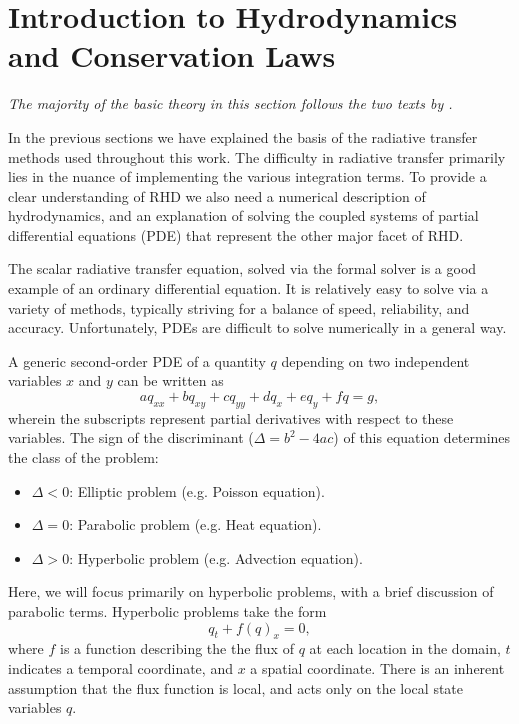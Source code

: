 \section{Introduction to Hydrodynamics and Conservation Laws}
\emph{The majority of the basic theory in this section follows the two texts by \citet{LeVeque1997,LeVeque2002}.}

In the previous sections we have explained the basis of the radiative transfer methods used throughout this work.
The difficulty in radiative transfer primarily lies in the nuance of implementing the various integration terms.
To provide a clear understanding of RHD we also need a numerical description of hydrodynamics, and an explanation of solving the coupled systems of partial differential equations (PDE) that represent the other major facet of RHD.

The scalar radiative transfer equation, solved via the formal solver is a good example of an ordinary differential equation.
It is relatively easy to solve via a variety of methods, typically striving for a balance of speed, reliability, and accuracy.
Unfortunately, PDEs are difficult to solve numerically in a general way.

A generic second-order PDE of a quantity $q$ depending on two independent variables $x$ and $y$ can be written as
\begin{equation}
    aq_{xx} + bq_{xy} + cq_{yy} + dq_x + eq_y + fq = g,
\end{equation}
wherein the subscripts represent partial derivatives with respect to these variables.
The sign of the discriminant ($\Delta = b^2-4ac$) of this equation determines the class of the problem:
\begin{itemize}
    \item $\Delta < 0$: Elliptic problem (e.g. Poisson equation).
    \item $\Delta = 0$: Parabolic problem (e.g. Heat equation).
    \item $\Delta > 0$: Hyperbolic problem (e.g. Advection equation).
\end{itemize}
Here, we will focus primarily on hyperbolic problems, with a brief discussion of parabolic terms.
Hyperbolic problems take the form
\begin{equation}\label{Eq:ConsLaw}
    q_t + f(q)_x = 0,
\end{equation}
where $f$ is a function describing the the flux of $q$ at each location in the domain, $t$ indicates a temporal coordinate, and $x$ a spatial coordinate.
There is an inherent assumption that the flux function is local, and acts only on the local state variables $q$.

